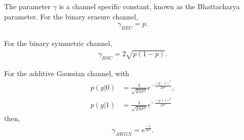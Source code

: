 The parameter \(\gamma\) is a channel specific constant, known as the Bhattacharya parameter. For the binary erasure channel, 
\begin{align*}
    \gamma_{BEC} = p.
\end{align*}

For the binary symmetric channel, 
\begin{align*}
    \gamma_{BSC} = 2 \sqrt{p(1-p)}.
\end{align*}

For the additive Gaussian channel, with 
\begin{align*}
    p(y|0) &= \frac{1}{\sqrt{2\pi \sigma^2}} e^{-\frac{(y-1)^2}{2\sigma^2}}, \\
    p(y|1) &= \frac{1}{\sqrt{2\pi \sigma^2}} e^{-\frac{(y+1)^2}{2\sigma^2}}
\end{align*}
then, 
\begin{align*}
    \gamma_{AWGN} = e^{\frac{-1}{2\sigma^2}}.
\end{align*}

